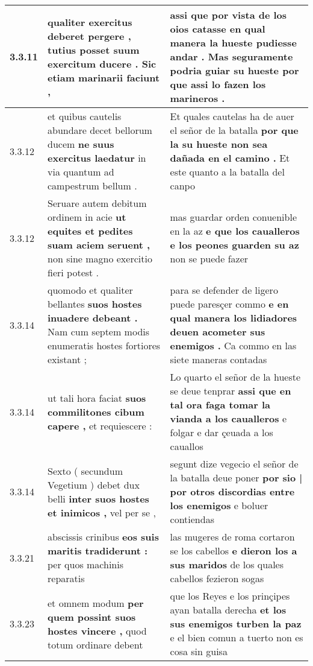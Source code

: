 \begin{tabular}{|p{1cm}|p{6.5cm}|p{6.5cm}|}
3.3.11 & qualiter exercitus deberet pergere , \textbf{ tutius posset suum exercitum ducere . } Sic etiam marinarii faciunt , & assi que por vista de los oios catasse en qual manera la hueste pudiesse andar . \textbf{ Mas seguramente podria guiar su hueste } por que assi lo fazen los marineros . \\\hline
3.3.12 & et quibus cautelis abundare decet bellorum ducem \textbf{ ne suus exercitus laedatur } in via quantum ad campestrum bellum . & Et quales cautelas ha de auer el señor de la batalla \textbf{ por que la su hueste non sea dañada en el camino . } Et este quanto a la batalla del canpo \\\hline
3.3.12 & Seruare autem debitum ordinem in acie \textbf{ ut equites et pedites suam aciem seruent , } non sine magno exercitio fieri potest . & mas guardar orden conuenible en la az \textbf{ e que los caualleros e los peones guarden su az } non se puede fazer \\\hline
3.3.14 & quomodo et qualiter bellantes \textbf{ suos hostes inuadere debeant . } Nam cum septem modis enumeratis hostes fortiores existant ; & para se defender de ligero puede paresçer commo \textbf{ e en qual manera los lidiadores deuen acometer sus enemigos . } Ca commo en las siete maneras contadas \\\hline
3.3.14 & ut tali hora faciat \textbf{ suos commilitones cibum capere , } et requiescere : & Lo quarto el señor de la hueste se deue tenprar \textbf{ assi que en tal ora faga tomar la vianda a los caualleros } e folgar e dar çeuada a los cauallos \\\hline
3.3.14 & Sexto ( secundum Vegetium ) debet dux belli \textbf{ inter suos hostes et inimicos , } vel per se , & segunt dize vegecio el señor de la batalla deue poner \textbf{ por sio | por otros discordias entre los enemigos } e boluer contiendas \\\hline
3.3.21 & abscissis crinibus \textbf{ eos suis maritis tradiderunt : } per quos machinis reparatis & las mugeres de roma cortaron se los cabellos \textbf{ e dieron los a sus maridos } de los quales cabellos fezieron sogas \\\hline
3.3.23 & et omnem modum \textbf{ per quem possint suos hostes vincere , } quod totum ordinare debent & que los Reyes e los prinçipes ayan batalla derecha \textbf{ et los sus enemigos turben la paz } e el bien comun a tuerto non es cosa sin guisa \\\hline

\end{tabular}
